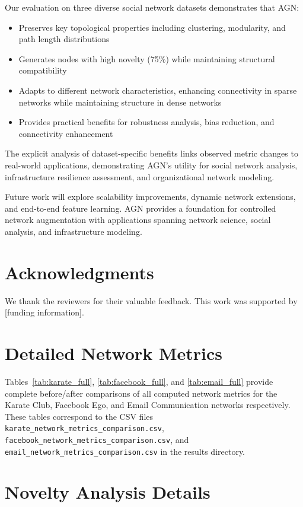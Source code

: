 \documentclass[12pt]{article}
\begin{document}
Our evaluation on three diverse social network datasets demonstrates that AGN:
\begin{itemize}
    \item Preserves key topological properties including clustering, modularity, and path length distributions
    \item Generates nodes with high novelty (75\%) while maintaining structural compatibility
    \item Adapts to different network characteristics, enhancing connectivity in sparse networks while maintaining structure in dense networks
    \item Provides practical benefits for robustness analysis, bias reduction, and connectivity enhancement
\end{itemize}

The explicit analysis of dataset-specific benefits links observed metric changes to real-world applications, demonstrating AGN's utility for social network analysis, infrastructure resilience assessment, and organizational network modeling.

Future work will explore scalability improvements, dynamic network extensions, and end-to-end feature learning. AGN provides a foundation for controlled network augmentation with applications spanning network science, social analysis, and infrastructure modeling.

\section*{Acknowledgments}

We thank the reviewers for their valuable feedback. This work was supported by [funding information].

\appendix

\section{Detailed Network Metrics}

Tables~\ref{tab:karate_full}, \ref{tab:facebook_full}, and \ref{tab:email_full} provide complete before/after comparisons of all computed network metrics for the Karate Club, Facebook Ego, and Email Communication networks respectively. These tables correspond to the CSV files \texttt{karate\_network\_metrics\_comparison.csv}, \texttt{facebook\_network\_metrics\_comparison.csv}, and \texttt{email\_network\_metrics\_comparison.csv} in the results directory.

\section{Novelty Analysis Details}
\end{document}
